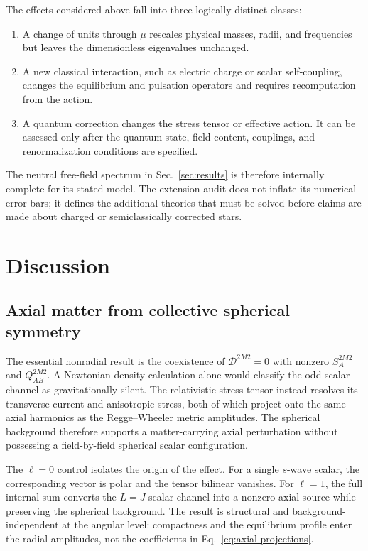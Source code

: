 \documentclass[aps,prd,preprint,onecolumn,nofootinbib,superscriptaddress,showkeys]{revtex4-2}
\begin{document}
The effects considered above fall into three logically distinct classes:
\begin{enumerate}[leftmargin=2.0em]
\item A change of units through $\mu$ rescales physical masses, radii, and frequencies but leaves the dimensionless eigenvalues unchanged.
\item A new classical interaction, such as electric charge or scalar self-coupling, changes the equilibrium and pulsation operators and requires recomputation from the action.
\item A quantum correction changes the stress tensor or effective action. It can be assessed only after the quantum state, field content, couplings, and renormalization conditions are specified.
\end{enumerate}
The neutral free-field spectrum in Sec.~\ref{sec:results} is therefore internally complete for its stated model. The extension audit does not inflate its numerical error bars; it defines the additional theories that must be solved before claims are made about charged or semiclassically corrected stars.

\fi
\section{Discussion}\label{sec:discussion}

\subsection{Axial matter from collective spherical symmetry}

The essential nonradial result is the coexistence of
$\mathcal D^{2M2}=0$ with nonzero $S_A^{2M2}$ and $Q_{AB}^{2M2}$. A
Newtonian density calculation alone would classify the odd scalar channel as
gravitationally silent. The relativistic stress tensor instead resolves its
transverse current and anisotropic stress, both of which project onto the
same axial harmonics as the Regge--Wheeler metric amplitudes. The spherical
background therefore supports a matter-carrying axial perturbation without
possessing a field-by-field spherical scalar configuration.

The $\ell=0$ control isolates the origin of the effect. For a single
$s$-wave scalar, the corresponding vector is polar and the tensor bilinear
vanishes. For $\ell=1$, the full internal sum converts the $L=J$ scalar
channel into a nonzero axial source while preserving the spherical
background. The result is structural and background-independent at the
angular level: compactness and the equilibrium profile enter the radial
amplitudes, not the coefficients in Eq.~\eqref{eq:axial-projections}.
\end{document}
